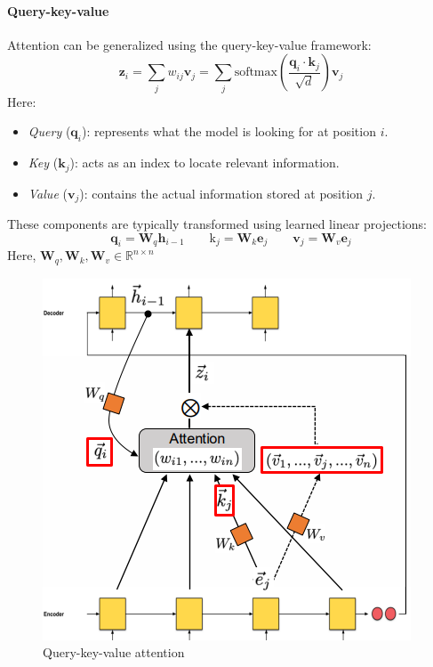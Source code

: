 \paragraph*{Query-key-value}
Attention can be generalized using the query-key-value framework:
\[\textbf{z}_i=\sum_jw_{ij}\textbf{v}_j =\sum_j\text{softmax}\left(\dfrac{\textbf{q}_{i}\cdot\textbf{k}_j}{\sqrt{d}}\right)\textbf{v}_j\]
\noindent Here:
\begin{itemize}
    \item \textit{Query} ($\textbf{q}_i$): represents what the model is looking for at position $i$.
    \item \textit{Key} ($\textbf{k}_j$): acts as an index to locate relevant information.
    \item \textit{Value} ($\textbf{v}_j$): contains the actual information stored at position $j$.
\end{itemize}
\noindent These components are typically transformed using learned linear projections:
\[\textbf{q}_i=\textbf{W}_q\textbf{h}_{i-1}\qquad\text{k}_j=\textbf{W}_k\textbf{e}_j\qquad\textbf{v}_j=\textbf{W}_v\textbf{e}_j\]
Here, $\textbf{W}_q,\textbf{W}_k,\textbf{W}_v\in\mathbb{R}^{n\times n}$
\begin{figure}[H]
    \centering
    \includegraphics[width=0.5\linewidth]{images/nlp5.png}
    \caption{Query-key-value attention}
\end{figure}

